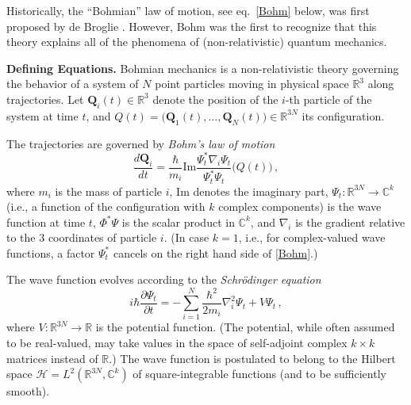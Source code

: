 \documentclass[12pt]{report}
\newcommand{\Hilbert}{\mathscr{H}}
\newcommand{\RRR}{\mathbb{R}}
\newcommand{\CCC}{\mathbb{C}}
\newcommand{\vQ}{\boldsymbol{Q}}
\newcommand{\im}{\mathrm{Im}}
\newcommand{\see}{}%
\begin{document}
Historically, the ``Bohmian'' law of motion, see eq.~\eqref{Bohm} below,
was first proposed by de Broglie \cite{deB}. However, Bohm \cite{Bohm52}
was the first to recognize that this theory explains all of the phenomena
of (non-relativistic) quantum mechanics. %


\bigskip

\noindent\textbf{Defining Equations.}
Bohmian mechanics is a non-relativistic theory governing the behavior of a system of $N$ point particles moving in physical space $\RRR^3$ along trajectories. Let $\vQ_i(t)\in\RRR^3$ denote the position of the $i$-th particle of the system at time $t$, and $Q(t) = \bigl(\vQ_1(t),\ldots, \vQ_N(t)\bigr)\in\RRR^{3N}$ its configuration. 

The trajectories are governed by \emph{Bohm's law of motion} \cite{Bohm52,Bell66}
\begin{equation}\label{Bohm}
\frac{d\vQ_i}{dt} = \frac{\hbar}{m_i} \im \frac{\Psi_t^* \nabla_i \Psi_t}{\Psi_t^* \Psi_t}\bigl(Q(t)\bigr)\,,
\end{equation}
where $m_i$ is the mass of particle $i$, $\im$ denotes the imaginary part,
$\Psi_t:\RRR^{3N} \to \CCC^k$ (i.e., a function of the configuration with $k$ complex components) is the wave function at time $t$, $\Phi^* \Psi$ is the scalar product in $\CCC^k$, and $\nabla_i$ is the gradient relative to the 3 coordinates of particle $i$. (In case $k=1$, i.e., for complex-valued wave functions, a factor $\Psi_t^*$ cancels on the right hand side of \eqref{Bohm}.)

The wave function evolves according to the \emph{Schr\"odinger equation}
\begin{equation}\label{Schr}
i\hbar \frac{\partial \Psi_t}{\partial t} = -\sum_{i=1}^N \frac{\hbar^2}{2m_i} \nabla_i^2 \Psi_t + V \Psi_t\,, 
\end{equation}
where $V: \RRR^{3N}\to\RRR$ is the potential function. (The potential, while often assumed to be real-valued, may take values in the space of self-adjoint complex $k\times k$ matrices instead of $\RRR$.) The wave function is postulated to belong to the \see Hilbert space $\Hilbert = L^2(\RRR^{3N},\CCC^k)$ of square-integrable functions (and to be sufficiently smooth).
\end{document}
